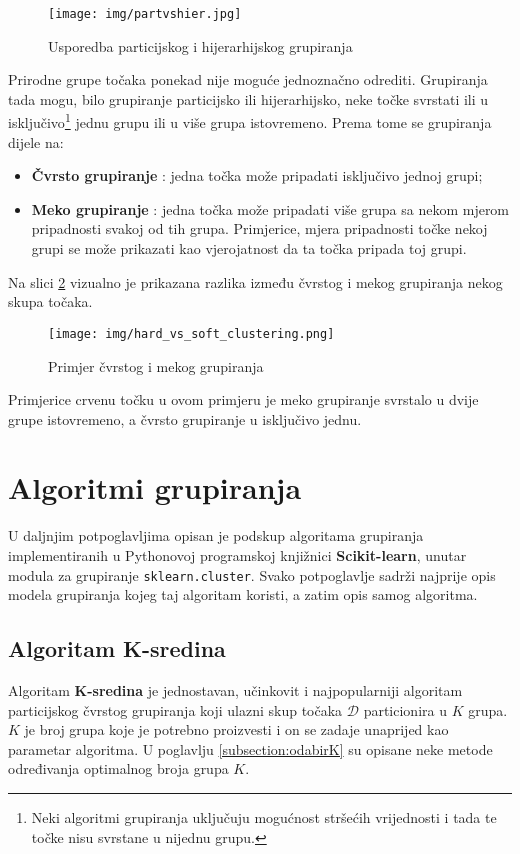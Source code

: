 \documentclass[times, utf8, zavrsni]{fer}
\begin{document}
\begin{figure}[H]
    \centering
    \texttt{[image: img/partvshier.jpg]}
    \caption{Usporedba particijskog i hijerarhijskog grupiranja \citep{viktormysko}}
    \label{fig:partvshier}
\end{figure}

Prirodne grupe točaka ponekad nije moguće jednoznačno odrediti. Grupiranja tada mogu, bilo grupiranje particijsko ili hijerarhijsko, neke točke svrstati ili u isključivo\footnote{Neki algoritmi grupiranja uključuju mogućnost stršećih vrijednosti i tada te točke nisu svrstane u nijednu grupu.} jednu grupu ili u više grupa istovremeno. Prema tome se grupiranja dijele na:
\begin{itemize}
    \item \textbf{Čvrsto grupiranje} : jedna točka može pripadati isključivo jednoj grupi;
    \item \textbf{Meko grupiranje} : jedna točka može pripadati više grupa sa nekom mjerom pripadnosti svakoj od tih grupa. Primjerice, mjera pripadnosti točke nekoj grupi se može prikazati kao vjerojatnost da ta točka pripada toj grupi.
\end{itemize}
Na slici \ref{fig:hard_vs_soft_clustering} vizualno je prikazana razlika između čvrstog i mekog grupiranja nekog skupa točaka. 
\begin{figure}[H]
    \centering
    \texttt{[image: img/hard\_vs\_soft\_clustering.png]}
    \caption{Primjer čvrstog i mekog grupiranja}
    \label{fig:hard_vs_soft_clustering}
\end{figure} Primjerice crvenu točku u ovom primjeru je meko grupiranje svrstalo u dvije grupe istovremeno, a čvrsto grupiranje u isključivo jednu.

\chapter{Algoritmi grupiranja}
\label{clusteringalgos}
U daljnjim potpoglavljima opisan je podskup algoritama grupiranja implementiranih u Pythonovoj programskoj knjižnici \textbf{Scikit-learn}, unutar modula za grupiranje \texttt{sklearn.cluster}. Svako potpoglavlje sadrži najprije opis modela grupiranja kojeg taj algoritam koristi, a zatim opis samog algoritma.
\section{Algoritam K-sredina} \label{kmeans}
Algoritam \textbf{K-sredina}  je jednostavan, učinkovit i najpopularniji algoritam particijskog čvrstog grupiranja koji ulazni skup točaka $\mathcal{D}$ particionira u $K$ grupa. $K$ je broj grupa koje je potrebno proizvesti i on se zadaje unaprijed kao parametar algoritma. U poglavlju \ref{subsection:odabirK} su opisane neke metode određivanja optimalnog broja grupa $K$.
\end{document}
